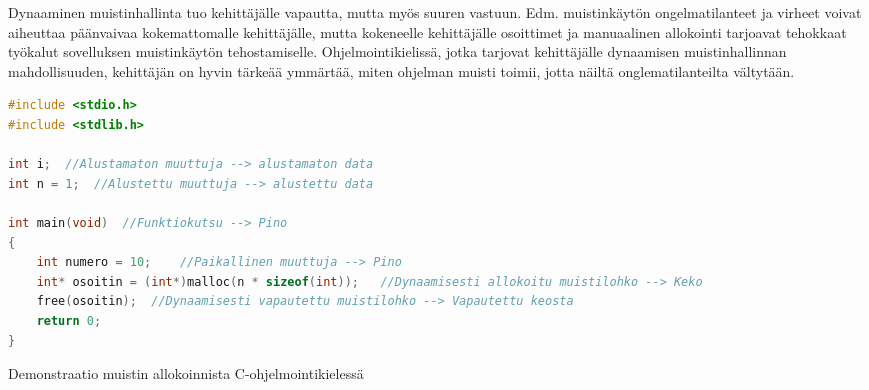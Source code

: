 Dynaaminen muistinhallinta tuo kehittäjälle vapautta, mutta myös suuren vastuun. Edm. muistinkäytön ongelmatilanteet ja virheet voivat aiheuttaa päänvaivaa kokemattomalle kehittäjälle, mutta kokeneelle kehittäjälle osoittimet ja manuaalinen allokointi tarjoavat tehokkaat työkalut sovelluksen muistinkäytön tehostamiselle. Ohjelmointikielissä, jotka tarjovat kehittäjälle dynaamisen muistinhallinnan mahdollisuuden, kehittäjän on hyvin tärkeää ymmärtää, miten ohjelman muisti toimii, jotta näiltä onglematilanteilta vältytään.

\begin{algorithm}[tbh]
\begin{lstlisting}[language=C]
#include <stdio.h>
#include <stdlib.h>

int i;  //Alustamaton muuttuja --> alustamaton data
int n = 1;  //Alustettu muuttuja --> alustettu data

int main(void)  //Funktiokutsu --> Pino
{  
    int numero = 10;    //Paikallinen muuttuja --> Pino
    int* osoitin = (int*)malloc(n * sizeof(int));   //Dynaamisesti allokoitu muistilohko --> Keko
    free(osoitin);  //Dynaamisesti vapautettu muistilohko --> Vapautettu keosta
    return 0;
}
\end{lstlisting}
\caption{Demonstraatio muistin allokoinnista C-ohjelmointikielessä\label{alg:Demonstraatio}}
\end{algorithm}
